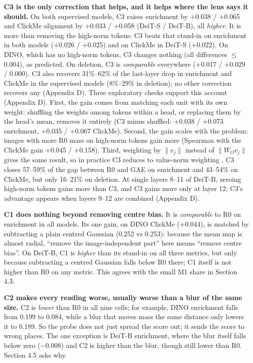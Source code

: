 \documentclass{article}
\begin{document}
\textbf{C3 is the only correction that helps, and it helps where the lens says it should.} On both supervised models, C3 raises enrichment by +0.038 / +0.065 and ClickMe alignment by +0.033 / +0.058 (DeiT-S / DeiT-B), all \emph{higher}. It is more than removing the high-norm tokens: C3 beats that stand-in on enrichment in both models (+0.026 / +0.025) and on ClickMe in DeiT-S (+0.022). On DINO, which has no high-norm tokens, C3 changes nothing (all differences $\le$ 0.004), as predicted. On deletion, C3 is \emph{comparable} everywhere (+0.017 / +0.029 / 0.000). C3 also recovers 31\%--62\% of the last-layer drop in enrichment and ClickMe in the supervised models (8\%--29\% in deletion); no other correction recovers any (Appendix D). Three exploratory checks support this account (Appendix D). First, the gain comes from matching each unit with its own weight: shuffling the weights among tokens within a head, or replacing them by the head's mean, removes it entirely (C3 minus shuffled: +0.038 / +0.073 enrichment, +0.035 / +0.067 ClickMe). Second, the gain scales with the problem: images with more R0 mass on high-norm tokens gain more (Spearman with the ClickMe gain +0.045 / +0.158). Third, weighting by $\lVert v_j\rVert$ instead of $\lVert W_O v_j\rVert$ gives the same result, so in practice C3 reduces to value-norm weighting \citep{kobayashi2020}. C3 closes 57--59\% of the gap between R0 and GAE on enrichment and 43--54\% on ClickMe, but only 16--21\% on deletion. At single layers 8--11 of DeiT-B, zeroing high-norm tokens gains more than C3, and C3 gains more only at layer 12; C3's advantage appears when layers 9--12 are combined (Appendix D).

\textbf{C1 does nothing beyond removing centre bias.} It is \emph{comparable} to R0 on enrichment in all models. Its one gain, on DINO ClickMe (+0.044), is matched by subtracting a plain centred Gaussian (0.252 vs 0.253): because the mean map is almost radial, ``remove the image-independent part'' here means ``remove centre bias''. On DeiT-B, C1 is \emph{higher} than its stand-in on all three metrics, but only because subtracting a centred Gaussian falls below R0 there; C1 itself is not higher than R0 on any metric. This agrees with the small M1 share in Section 4.3.

\textbf{C2 makes every reading worse, usually worse than a blur of the same size.} C2 is \emph{lower} than R0 in all nine cells; for example, DINO enrichment falls from 0.199 to 0.084, while a blur that moves mass the same distance only lowers it to 0.189. So the probe does not just spread the score out; it sends the score to wrong places. The one exception is DeiT-B enrichment, where the blur itself falls below zero ($-$0.008) and C2 is higher than the blur, though still lower than R0. Section 4.5 asks why.
\end{document}
